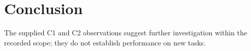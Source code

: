 \section{Conclusion}
The supplied C1 and C2 observations suggest further investigation within the recorded scope; they do not establish performance on new tasks.
